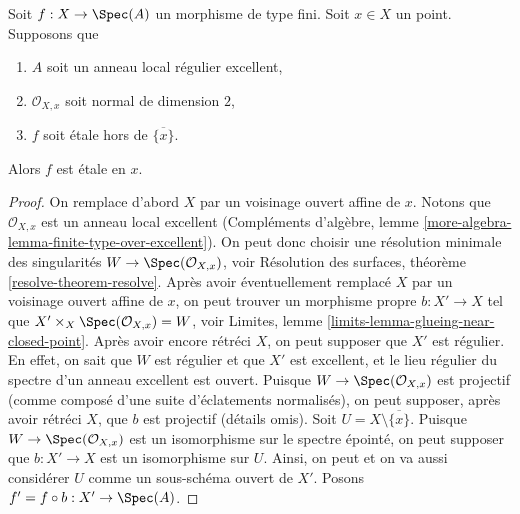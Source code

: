 \begin{lemma}
\label{lemma-key-purity-ramification}
Soit $f : X \to \Spec(A)$ un morphisme de type fini.
Soit $x \in X$ un point. Supposons que
\begin{enumerate}
\item $A$ soit un anneau local régulier excellent,
\item $\mathcal{O}_{X, x}$ soit normal de dimension $2$,
\item $f$ soit \'etale hors de $\overline{\{x\}}$.
\end{enumerate}
Alors $f$ est \'etale en $x$.
\end{lemma}

\begin{proof}
On remplace d'abord $X$ par un voisinage ouvert affine de $x$.
Notons que $\mathcal{O}_{X, x}$ est un anneau local excellent
(Compléments d'algèbre, lemme \ref{more-algebra-lemma-finite-type-over-excellent}).
On peut donc choisir une résolution minimale des singularités
$W \to \Spec(\mathcal{O}_{X, x})$, voir
Résolution des surfaces, théorème \ref{resolve-theorem-resolve}.
Après avoir éventuellement remplacé $X$ par un voisinage ouvert affine de $x$,
on peut trouver un morphisme propre $b : X' \to X$ tel que
$X' \times_X \Spec(\mathcal{O}_{X, x}) = W$, voir
Limites, lemme \ref{limits-lemma-glueing-near-closed-point}.
Après avoir encore rétréci $X$, on peut supposer que $X'$ est régulier.
En effet, on sait que $W$ est régulier et que $X'$ est excellent,
et le lieu régulier du spectre d'un anneau excellent est ouvert.
Puisque $W \to \Spec(\mathcal{O}_{X, x})$ est projectif
(comme composé d'une suite d'éclatements normalisés), on peut supposer,
après avoir rétréci $X$, que $b$ est projectif (détails omis).
Soit $U = X \setminus \overline{\{x\}}$.
Puisque $W \to \Spec(\mathcal{O}_{X, x})$ est un isomorphisme sur le
spectre épointé, on peut supposer que $b : X' \to X$ est un isomorphisme sur $U$.
Ainsi, on peut et on va aussi considérer $U$ comme un sous-schéma ouvert de $X'$.
Posons $f' = f \circ b : X' \to \Spec(A)$.


\end{proof}
